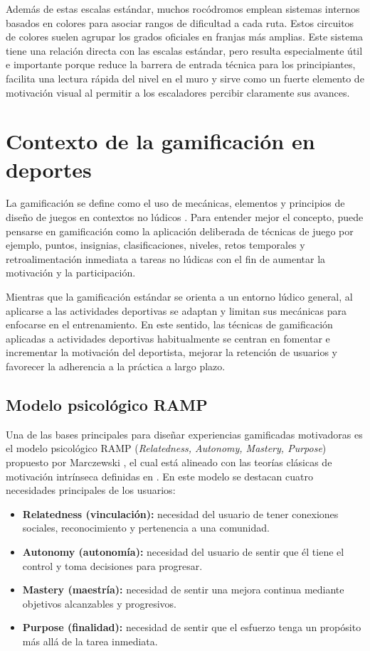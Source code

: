 Además de estas escalas estándar, muchos rocódromos emplean sistemas internos basados en colores para asociar rangos de dificultad a cada ruta. Estos circuitos de colores suelen agrupar los grados oficiales en franjas más amplias. Este sistema tiene una relación directa con las escalas estándar, pero resulta especialmente útil e importante porque reduce la barrera de entrada técnica para los principiantes, facilita una lectura rápida del nivel en el muro y sirve como un fuerte elemento de motivación visual al permitir a los escaladores percibir claramente sus avances.


\section{Contexto de la gamificación en deportes}

La gamificación se define como el uso de mecánicas, elementos y principios de diseño de juegos en contextos no lúdicos \citep{deterding2011game}. Para entender mejor el concepto, puede pensarse en gamificación como la aplicación deliberada de técnicas de juego por ejemplo, puntos, insignias, clasificaciones, niveles, retos temporales y retroalimentación inmediata a tareas no lúdicas con el fin de aumentar la motivación y la participación. 

Mientras que la gamificación estándar se orienta a un entorno lúdico general, al aplicarse a las actividades deportivas se adaptan y limitan sus mecánicas para enfocarse en el entrenamiento. En este sentido, las técnicas de gamificación aplicadas a actividades deportivas habitualmente se centran en fomentar e incrementar la motivación del deportista, mejorar la retención de usuarios y favorecer la adherencia a la práctica a largo plazo.

\subsection{Modelo psicológico RAMP}

Una de las bases principales para diseñar experiencias gamificadas motivadoras es el modelo psicológico RAMP (\textit{Relatedness, Autonomy, Mastery, Purpose}) propuesto por Marczewski \citep{marczewski2015even}, el cual está alineado con las teorías clásicas de motivación intrínseca definidas en \cite{ryan2000self}. En este modelo se destacan cuatro necesidades principales de los usuarios:

\begin{itemize}
	\item \textbf{Relatedness (vinculación):} necesidad del usuario de tener conexiones sociales, reconocimiento y pertenencia a una comunidad.
	\item \textbf{Autonomy (autonomía):} necesidad del usuario de sentir que él tiene el control y toma decisiones para progresar.
	\item \textbf{Mastery (maestría):} necesidad de sentir una mejora continua mediante objetivos alcanzables y progresivos.
	\item \textbf{Purpose (finalidad):} necesidad de sentir que el esfuerzo tenga un propósito más allá de la tarea inmediata.
\end{itemize}

